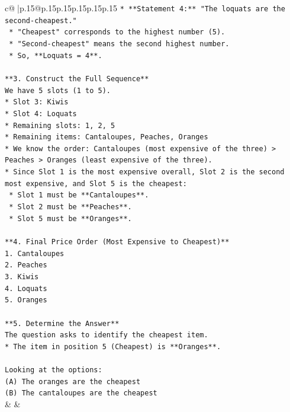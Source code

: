 \documentclass{article}
\begin{document}
{\begin{supertabular}{c@{$\;$}|p{.15\linewidth}@{}p{.15\linewidth}p{.15\linewidth}p{.15\linewidth}p{.15\linewidth}p{.15\linewidth}}
{{{\texttt{*   **Statement 4:** "The loquats are the second{-}cheapest."} \\
\texttt{    *   "Cheapest" corresponds to the highest number (5).} \\
\texttt{    *   "Second{-}cheapest" means the second highest number.} \\
\texttt{    *   So, **Loquats = 4**.} \\
\\ 
\texttt{**3. Construct the Full Sequence**} \\
\texttt{We have 5 slots (1 to 5).} \\
\texttt{*   Slot 3: Kiwis} \\
\texttt{*   Slot 4: Loquats} \\
\texttt{*   Remaining slots: 1, 2, 5} \\
\texttt{*   Remaining items: Cantaloupes, Peaches, Oranges} \\
\texttt{*   We know the order: Cantaloupes (most expensive of the three) > Peaches > Oranges (least expensive of the three).} \\
\texttt{*   Since Slot 1 is the most expensive overall, Slot 2 is the second most expensive, and Slot 5 is the cheapest:} \\
\texttt{    *   Slot 1 must be **Cantaloupes**.} \\
\texttt{    *   Slot 2 must be **Peaches**.} \\
\texttt{    *   Slot 5 must be **Oranges**.} \\
\\ 
\texttt{**4. Final Price Order (Most Expensive to Cheapest)**} \\
\texttt{1.  Cantaloupes} \\
\texttt{2.  Peaches} \\
\texttt{3.  Kiwis} \\
\texttt{4.  Loquats} \\
\texttt{5.  Oranges} \\
\\ 
\texttt{**5. Determine the Answer**} \\
\texttt{The question asks to identify the cheapest item.} \\
\texttt{*   The item in position 5 (Cheapest) is **Oranges**.} \\
\\ 
\texttt{Looking at the options:} \\
\texttt{(A) The oranges are the cheapest} \\
\texttt{(B) The cantaloupes are the cheapest} \\
            }
        }
    }
    & & \\ \\


\end{supertabular}}
\end{document}
